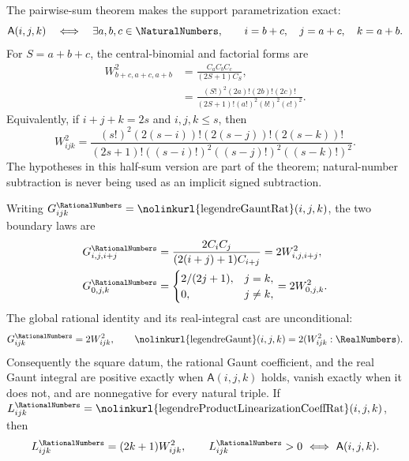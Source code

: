\documentclass[11pt,oneside]{article}
\theoremstyle{definition}
\theoremstyle{remark}
\newcommand{\lean}[1]{%
  \ifmmode\text{\nolinkurl{#1}}\else\nolinkurl{#1}\fi}
\begin{document}
The pairwise-sum theorem makes the support parametrization exact:
\begin{equation}
 \mathsf A(i,j,k)\quad\Longleftrightarrow\quad
 \exists a,b,c\in\NaturalNumbers,\qquad
 i=b+c,\quad j=a+c,\quad k=a+b.                 \label{eq:legendre-gaunt-pairwise-support}
\end{equation}
For \(S=a+b+c\), the central-binomial and factorial forms are
\begin{align}
 W^2_{b+c,a+c,a+b}
 &=\frac{C_aC_bC_c}{(2S+1)C_S},                                      \label{eq:legendre-wigner-pairwise-central}\\
 &=\frac{(S!)^2(2a)!(2b)!(2c)!}
 {(2S+1)!(a!)^2(b!)^2(c!)^2}.                                       \label{eq:legendre-wigner-pairwise-factorial}
\end{align}
Equivalently, if \(i+j+k=2s\) and \(i,j,k\le s\), then
\begin{equation}
 W^2_{ijk}=
 \frac{(s!)^2(2(s-i))!(2(s-j))!(2(s-k))!}
 {(2s+1)!((s-i)!)^2((s-j)!)^2((s-k)!)^2}.             \label{eq:legendre-wigner-halfsum-factorial}
\end{equation}
The hypotheses in this half-sum version are part of the theorem; natural-number
subtraction is never being used as an implicit signed subtraction.

Writing \(G^{\RationalNumbers}_{ijk}=\lean{legendreGauntRat}(i,j,k)\), the two boundary
laws are
\begin{align}
 G^{\RationalNumbers}_{i,j,i+j}
 &=\frac{2C_iC_j}{(2(i+j)+1)C_{i+j}}
   =2W^2_{i,j,i+j},                                      \label{eq:legendre-gaunt-add-boundary-closed}\\
 G^{\RationalNumbers}_{0,j,k}
 &=\begin{cases}2/(2j+1),&j=k,\\0,&j\ne k,
   \end{cases}
   =2W^2_{0,j,k}.                                        \label{eq:legendre-gaunt-zero-boundary-closed}
\end{align}
The global rational identity and its real-integral cast are unconditional:
\begin{equation}
 G^{\RationalNumbers}_{ijk}=2W^2_{ijk},\qquad
 \lean{legendreGaunt}(i,j,k)=2(W^2_{ijk}:\RealNumbers).  \label{eq:legendre-gaunt-wigner-global}
\end{equation}
Consequently the square datum, the rational Gaunt coefficient, and the real Gaunt
integral are positive exactly when \(\mathsf A(i,j,k)\) holds, vanish exactly when it
does not, and are nonnegative for every natural triple.  If
\(L^{\RationalNumbers}_{ijk}=\lean{legendreProductLinearizationCoeffRat}(i,j,k)\), then
\begin{equation}
 L^{\RationalNumbers}_{ijk}=(2k+1)W^2_{ijk},
 \qquad L^{\RationalNumbers}_{ijk}>0\ \Longleftrightarrow\ \mathsf A(i,j,k).
                                                               \label{eq:legendre-linearization-wigner-square}
\end{equation}
\end{document}
